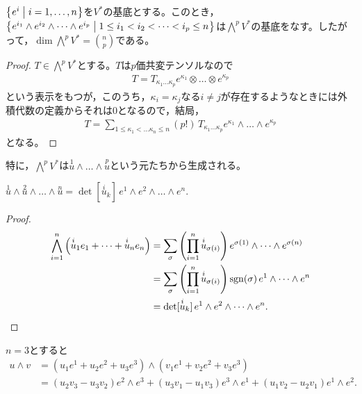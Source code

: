 \documentclass[uplatex]{jsarticle}
\begin{document}
\begin{prop}
  $\Set{\hspace{-1.8pt} e^{i} | i = 1,\dots, n \hspace{-1.8pt}}$を$V^{*}$の基底とする。このとき，$\Set{\hspace{-1.8pt} e^{i_{1}} \wedge e^{i_{2}} \wedge \dots \wedge e^{i_{p}} | 1 \le i_{1} < i_{2} < \dots < i_{p} \le n \hspace{-1.8pt}}$は${\displaystyle \bigwedge^{p} V^{*}}$の基底をなす。したがって，${\displaystyle \dim \bigwedge^{p} V^{*} = \binom{n}{p}}$である。
\end{prop}
\begin{proof}
  $T \in \bigwedge^{p} V^{*}$とする。$T$は$p$価共変テンソルなので
  \begin{align*}
    T = T_{\kappa_{1} \dots \kappa_{p}} e^{\kappa_{1}} \otimes \dots \otimes e^{\kappa_{p}}
  \end{align*}
  という表示をもつが，このうち，$\kappa_{i} = \kappa_{j}$なる$i \neq j$が存在するようなときには外積代数の定義からそれは$0$となるので，結局，
  \begin{align*}
    T = \sum_{1 \le \kappa_{1} < \dots \kappa_{n} \le n} (p!) \, T_{\kappa_{1} \dots \kappa_{p}} e^{\kappa_{1}} \wedge \dots \wedge e^{\kappa_{p}}
  \end{align*}
  となる。
\end{proof}

特に，$\displaystyle \bigwedge^{p} V^{*}$は$\overset{1}{u} \wedge \dots \wedge \overset{p}{u}$という元たちから生成される。

\begin{hodai}
  $\overset{1}{u} \wedge \overset{2}{u} \wedge \dots \wedge \overset{n}{u} = \det [\overset{i}{u}_{k}] \, e^{1} \wedge e^{2} \wedge \dots \wedge e^{n}$.
\end{hodai}
\begin{proof}
  \begin{align*}
    \bigwedge_{i=1}^{n} \left( \overset{i}{u}_{1} e_{1} + \dots + \overset{i}{u}_{n} e_{n} \right) &= \sum_{\sigma} \left( \prod_{i=1}^{n} \overset{i}{u}_{\sigma(i)} \right) e^{\sigma(1)} \wedge \dots \wedge e^{\sigma(n)} \\
    &= \sum_{\sigma} \left( \prod_{i=1}^{n} \overset{i}{u}_{\sigma(i)} \right) \operatorname{sgn} (\sigma) \, e^{1} \wedge \dots \wedge e^{n} \\
    &= \det [\overset{i}{u}_{k}] \, e^{1} \wedge e^{2} \wedge \dots \wedge e^{n}.
  \end{align*}
\end{proof}

\begin{rei}
  \label{eg:wedge}
  $n = 3$とすると
  \begin{align*}
    u \wedge v &= (u_{1} e^{1} + u_{2} e^{2} + u_{3} e^{3}) \wedge (v_{1} e^{1} + v_{2} e^{2} + v_{3} e^{3}) \\
    &= (u_{2}v_{3} - u_{3}v_{2}) e^{2} \wedge e^{3} + (u_{3}v_{1} - u_{1}v_{3}) e^{3} \wedge e^{1} + (u_{1}v_{2} - u_{2}v_{1}) e^{1} \wedge e^{2}.
  \end{align*}
\end{rei}
\end{document}
